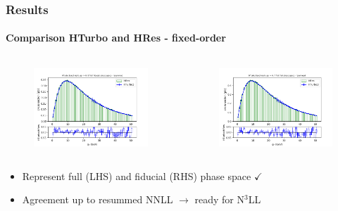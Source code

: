 \documentclass[aspectratio=43]{beamer}
\begin{document}
\begin{frame}

	\frametitle{Results}
	\framesubtitle{Comparison HTurbo and HRes - fixed-order}
	
	\begin{columns}
		
		
		\begin{figure}
			\includegraphics[width = 7cm]{plots/part3/hturbo_figure_6.png}
		\end{figure}
		
		
		\begin{figure}
			\includegraphics[width = 7cm]{plots/part3/hturbo_figure_7.png}
		\end{figure}
		
	\end{columns}
	
	\begin{itemize}
		\item Represent full (LHS) and fiducial (RHS) phase space {\color{darkgreen}$\checkmark$} 
		\item Agreement up to resummed NNLL $\longrightarrow$ {\color{blue}ready for N$^{3}$LL}
	\end{itemize}

\end{frame}
\end{document}
